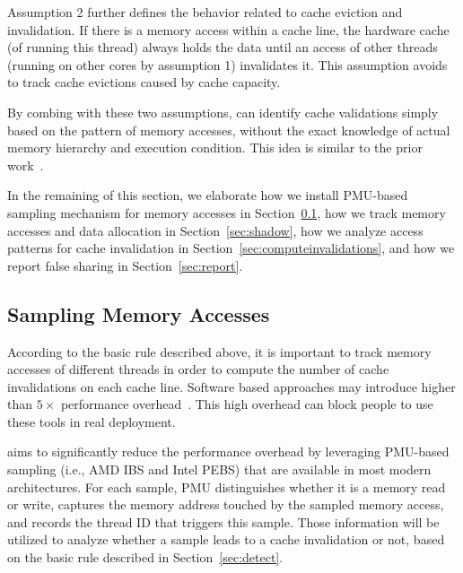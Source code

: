 Assumption 2 further defines the behavior related to cache eviction and invalidation. If there is a memory access within a cache line, the hardware cache (of running this thread) always holds the data until an access of other threads (running on other cores by assumption 1) invalidates it. This assumption avoids to track cache evictions caused by cache capacity. 

By combing with these two assumptions, \cheetah{} can identify cache validations simply based on the pattern of memory accesses, without the exact knowledge of actual memory hierarchy and execution condition. This idea is similar to the prior work~\cite{Predator, qinzhao}. 

In the remaining of this section, we elaborate how we install PMU-based sampling mechanism for memory accesses in Section~\ref{sec:perfcounter}, how we track memory accesses and data allocation in Section~\ref{sec:shadow}, how we analyze access patterns for cache invalidation in Section~\ref{sec:computeinvalidations}, and how we report false sharing in Section~\ref{sec:report}.

\subsection{Sampling Memory Accesses}
\label{sec:perfcounter}

According to the basic rule described above, it is important to track memory accesses of different threads in order to compute the number of cache invalidations on each cache line. Software based approaches may introduce higher than $5\times$ performance overhead~\cite{Predator, qinzhao}. This high overhead can block people to use these tools in real deployment.

\cheetah{} aims to significantly reduce the performance overhead by leveraging PMU-based sampling (i.e., AMD IBS and Intel PEBS) that are available in most modern architectures. 
For each sample, PMU distinguishes whether it is a memory read or write, captures the memory address touched by the sampled memory access, and records the thread ID that triggers this sample. Those information will be utilized to analyze whether a sample leads to a cache invalidation or not, based on the basic rule described in Section~\ref{sec:detect}.

